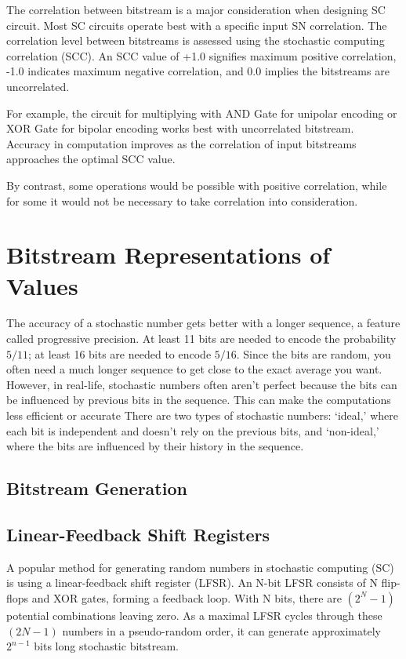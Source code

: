 The correlation between bitstream is a major consideration when designing SC circuit. Most SC circuits operate best with a specific input SN correlation. The correlation level between bitstreams is assessed using the stochastic computing correlation (SCC). An SCC value of +1.0 signifies maximum positive correlation, -1.0 indicates maximum negative correlation, and 0.0 implies the bitstreams are uncorrelated. 

For example, the circuit for multiplying with AND Gate for unipolar encoding or XOR Gate for bipolar encoding works best with uncorrelated bitstream. Accuracy in computation improves as the correlation of input bitstreams approaches the optimal SCC value.

By contrast, some operations would be possible with positive correlation, while for some it would not be necessary to take correlation into consideration. 

\section{Bitstream Representations of Values}
\label{sec:review:sec2}

The accuracy of a stochastic number gets better with a longer sequence, a
feature called progressive precision. At least 11 bits are needed to encode the
probability $5/11$; at least 16 bits are needed to encode $5/16$. Since the
bits are random, you often need a much longer sequence to get close to the exact
average you want. However, in real-life, stochastic numbers often aren't perfect
because the bits can be influenced by previous bits in the sequence. This can
make the computations less efficient or accurate There are two types of
stochastic numbers: `ideal,' where each bit is independent and doesn't rely on
the previous bits, and `non-ideal,' where the bits are influenced by their
history in the sequence.

\subsection{Bitstream Generation}

\subsection {Linear-Feedback Shift Registers}

A popular method for generating random numbers in stochastic computing (SC) is
using a linear-feedback shift register (LFSR). An N-bit LFSR consists of N
flip-flops and XOR gates, forming a feedback loop. With N bits, there are
$ (2^ N - 1)$ potential combinations leaving zero. As a maximal LFSR
cycles through these  $(2 N - 1 )$ numbers in a pseudo-random order, it can generate approximately  $2^ {n-1}$ bits long stochastic bitstream. 

